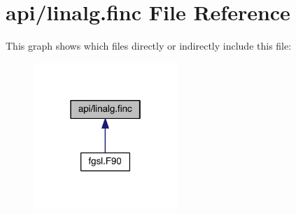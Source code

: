 \hypertarget{linalg_8finc}{\section{api/linalg.finc File Reference}
\label{linalg_8finc}
}
This graph shows which files directly or indirectly include this file\-:
\nopagebreak
\begin{figure}[H]
\begin{center}
\leavevmode
\includegraphics[width=154pt]{linalg_8finc__dep__incl}
\end{center}
\end{figure}
